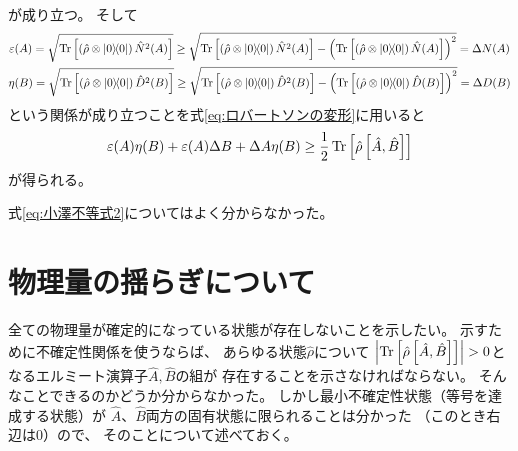 \documentclass[a4paper, 10pt, uplatex]{jsarticle}
\begin{document}
\begin{problem}
\begin{align}
		\label{eq:ロバートソンの変形}
	\end{align}
	が成り立つ。
	そして
	\begin{gather}
		\varepsilon (A)
		= \sqrt{\Tr \left[ \left( \hat{\rho} \otimes \Ketbra{0}{0} \right)
		\hat{N}^2 (A) \right]}
		\geq \sqrt{\Tr \left[ \left( \hat{\rho} \otimes \Ketbra{0}{0} \right)
		\hat{N}^2 (A) \right]
		- \left( \Tr \left[ \left( \hat{\rho} \otimes \Ketbra{0}{0} \right)
		\hat{N}(A) \right] \right)^2}
		= \Delta N(A) \\
		\eta (B)
		= \sqrt{\Tr \left[ \left( \hat{\rho} \otimes \Ketbra{0}{0} \right)
		\hat{D}^2 (B) \right]}
		\geq \sqrt{\Tr \left[ \left( \hat{\rho} \otimes \Ketbra{0}{0} \right)
		\hat{D}^2 (B) \right]
		- \left( \Tr \left[ \left( \hat{\rho} \otimes \Ketbra{0}{0} \right)
		\hat{D}(B) \right] \right)^2}
		= \Delta D(B)
	\end{gather}
	という関係が成り立つことを式\eqref{eq:ロバートソンの変形}に用いると
	\begin{align}
		\varepsilon (A) \eta (B) + \varepsilon (A) \Delta B
		+ \Delta A \eta (B)
		\geq \frac{1}{2} \operatorname*{Tr} \left[ \hat{\rho}
		\left[ \hat{A}, \hat{B} \right] \right]
	\end{align}
	が得られる。
	
	式\eqref{eq:小澤不等式2}についてはよく分からなかった。
\end{problem}

\appendix
\section{物理量の揺らぎについて}
\label{ap:考察}
全ての物理量が確定的になっている状態が存在しないことを示したい。
示すために不確定性関係を使うならば、
あらゆる状態$\hat{\rho}$について
$\left| \operatorname*{Tr} \left[ \hat{\rho} \left[ \hat{A}, \hat{B} \right] \right] \right|
> 0$となるエルミート演算子$\hat{A}, \hat{B}$の組が
存在することを示さなければならない。
そんなことできるのかどうか分からなかった。
しかし最小不確定性状態（等号を達成する状態）が
$\hat{A}$、$\hat{B}$両方の固有状態に限られることは分かった
（このとき右辺は0）ので、
そのことについて述べておく。
\end{document}
